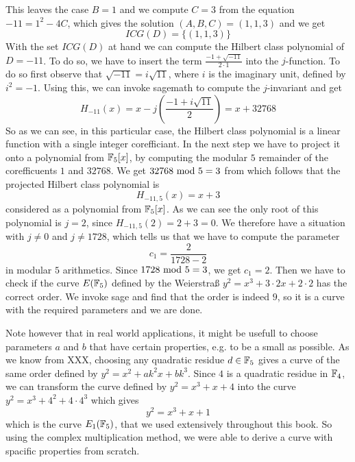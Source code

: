 \begin{example}
This leaves the case $B=1$ and we compute $C=3$ from the equation $-11 = 1^2 -4C$, which gives the solution $(A,B,C)=(1,1,3)$ and we get
$$
ICG(D)=\{(1,1,3)\}
$$
With the set $ICG(D)$ at hand we can compute the Hilbert class polynomial of $D=-11$. To do so, we have to insert the term $\frac{-1+\sqrt{-11}}{2\cdot1}$ into the $j$-function. To do so first observe that $\sqrt{-11}=i\sqrt{11}$, where $i$ is the imaginary unit, defined by $i^2=-1$. Using this, we can invoke sagemath to compute the $j$-invariant and get
$$
H_{-11}(x) = x - j\left(\frac{-1+i\sqrt{11}}{2}\right) = x + 32768
$$
So as we can see, in this particular case, the Hilbert class polynomial is a linear function with a single integer corefficiant. In the next step we have to project it onto a polynomial from $\mathbb{F}_5[x]$, by computing the modular $5$ remainder of the corefficuents $1$ and $32768$. We get $32768 \text{ mod } 5=3$ from which follows that the projected Hilbert class polynomial is
$$
H_{-11,5}(x)=x+3
$$
considered as a polynomial from $\mathbb{F}_5[x]$. As we can see the only root of this polynomial is $j=2$, since $H_{-11,5}(2)=2+3=0$. We therefore have a situation with $j\neq 0$ and $j\neq 1728$, which tells us that we have to compute the parameter
$$
c_1=\frac{2}{1728-2}
$$
in modular $5$ arithmetics. Since $1728 \text{ mod } 5=3$, we get $c_1=2$. Then we have to check if the curve $E(\mathbb{F}_5)$ defined by the Weierstraß  $y^2 = x^3 + 3\cdot 2 x + 2\cdot 2$ has the correct order. We invoke sage and find that the order is indeed $9$, so it is a curve with the required parameters and we are done.

Note however that in real world applications, it might be usefull to choose parameters $a$ and $b$ that have certain properties, e.g. to be a small as possible. As we know from XXX, choosing any quadratic residue $d\in \mathbb{F}_5$ gives a curve of the same order defined by $y^2 = x^2 + a k^2 x + bk^3$. Since $4$ is a quadratic residue in $\mathbb{F}_4$, we can transform the curve defined by
$y^2 = x^3 +x+4$ into the curve $y^2 = x^3 + 4^2 + 4\cdot 4^3$ which gives
$$
y^2 = x^3 + x +1
$$
which is the curve $E_1(\mathbb{F}_5)$, that we used extensively throughout this book. So using the complex multiplication method, we were able to derive a curve with spacific properties from scratch.
\end{example}
